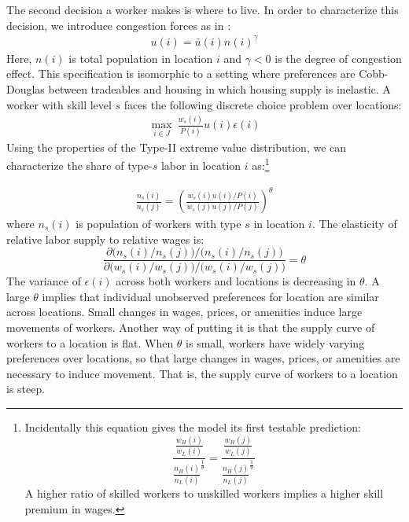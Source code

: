 \documentclass[12 pt]{article}
\begin{document}
The second decision a worker makes is where to live.  In order to characterize this decision, we introduce congestion forces as in \citet{allen2014trade}:
\begin{eqnarray}\label{eq:congestion}
u(i) = \bar{u}(i)  n(i)^{\gamma}
\end{eqnarray}
Here, $n(i)$ is total population in location $i$ and $\gamma<0$ is the degree of congestion effect. This specification is isomorphic to a setting where preferences are Cobb-Douglas between tradeables and housing in which housing supply is inelastic.
A worker with skill level $s$ faces the following discrete choice problem over locations:
\begin{eqnarray} 
\max_{i \in J}~ \frac{w_s(i)}{P(i)}u(i) \epsilon(i)  \nonumber
\end{eqnarray}
Using the properties of the Type-II extreme value distribution, we can characterize the share of type-$s$ labor in location $i$ as:\footnote{Incidentally this equation gives the model its first testable prediction:
    \begin{equation*}
        \frac{\frac{w_H(i)}{w_L(i)}}{\frac{n_H(i)}{n_L(i)}^\frac{1}{\theta}} = \frac{\frac{w_H(j)}{w_L(j)}}{\frac{n_H(j)}{n_L(j)}^\frac{1}{\theta}}
    \end{equation*}
    A higher ratio of skilled workers to unskilled workers implies a higher skill premium in wages.}
    

\begin{eqnarray}
    \frac{n_s(i)}{n_s(j)} = \left(
	\frac{w_s(i)u(i)/P(i)}
	{w_s(j)u(j) /P(j)}\right)^\theta
    \label{eq:rel_pops}
\end{eqnarray} 
where $n_s(i)$ is population of workers with type $s$ in location $i$.
The elasticity of relative labor supply to relative wages is:
\[
\frac{ \partial \Big(n_s(i)/n_s(j)\Big) \Big/
\Big(n_s(i)/n_s(j)\Big)}
{\partial \Big(w_s(i)/w_s(j)\Big) \Big/
\Big(w_s(i)/w_s(j)\Big) } = \theta
\]
The variance of $\epsilon(i)$ across both workers and locations is decreasing in $\theta$. A large $\theta$ implies that individual unobserved preferences for location are similar across locations. Small changes in wages, prices, or amenities induce large movements of workers.  Another way of putting it is that the supply curve of workers to a location is flat.  When $\theta$ is small, workers have widely varying preferences over locations, so that large changes in wages, prices, or amenities are necessary to induce movement.  That is, the supply curve of workers to a location is steep.
\end{document}
